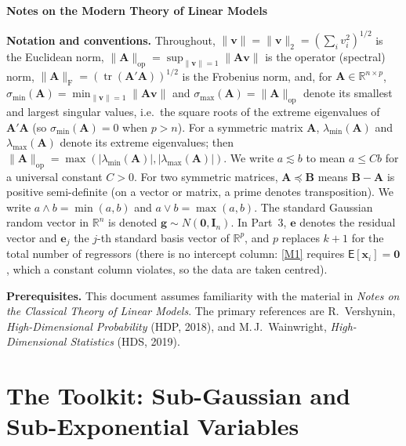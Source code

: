 \documentclass[14pt]{extarticle}
\theoremstyle{plain}
\theoremstyle{definition}
\theoremstyle{remark}
\newcommand\expc{\mathsf{E}}
\DeclareMathOperator\tr{tr}
\newcommand{\bx}{\mathbf{x}}
\newcommand{\bI}{\mathbf{I}}
\newcommand{\bzero}{\mathbf{0}}
\newcommand{\bA}{\mathbf{A}}
\newcommand{\bv}{\mathbf{v}}
\newcommand{\Real}{\mathbb{R}}
\newcommand{\opnorm}[1]{\|#1\|_{\mathrm{op}}}
\newcommand{\fnorm}[1]{\|#1\|_{\mathrm{F}}}
\begin{document}
\begingroup
\centering
{\LARGE\bfseries Notes on the Modern Theory of Linear Models\par}
\vspace{4pt}
\endgroup


\noindent\textbf{Notation and conventions.}\; Throughout, $\|\bv\| = \|\bv\|_2 = (\sum_i v_i^2)^{1/2}$ is the Euclidean norm, $\opnorm{\bA} = \sup_{\|\bv\|=1}\|\bA\bv\|$ is the operator (spectral) norm, $\fnorm{\bA} = (\tr(\bA'\bA))^{1/2}$ is the Frobenius norm, and, for $\bA \in \Real^{n \times p}$, $\sigma_{\min}(\bA) = \min_{\|\bv\|=1}\|\bA\bv\|$ and $\sigma_{\max}(\bA) = \opnorm{\bA}$ denote its smallest and largest singular values, i.e.\ the square roots of the extreme eigenvalues of $\bA'\bA$ (so $\sigma_{\min}(\bA) = 0$ when $p > n$). For a symmetric matrix $\bA$, $\lambda_{\min}(\bA)$ and $\lambda_{\max}(\bA)$ denote its extreme eigenvalues; then $\opnorm{\bA} = \max(|\lambda_{\min}(\bA)|, |\lambda_{\max}(\bA)|)$. We write $a \lesssim b$ to mean $a \leqslant Cb$ for a universal constant $C > 0$. For two symmetric matrices, $\bA \preceq \mathbf{B}$ means $\mathbf{B} - \bA$ is positive semi-definite (on a vector or matrix, a prime denotes transposition). We write $a \wedge b = \min(a,b)$ and $a \vee b = \max(a,b)$. The standard Gaussian random vector in $\Real^n$ is denoted $\mathbf{g} \sim N(\bzero, \bI_n)$. In Part~3, $\mathbf{e}$ denotes the residual vector and $\mathbf{e}_j$ the $j$-th standard basis vector of $\Real^p$, and $p$ replaces $k+1$ for the total number of regressors (there is no intercept column: \ref{M1} requires $\expc[\bx_i] = \bzero$, which a constant column violates, so the data are taken centred).

\bigskip\noindent\textbf{Prerequisites.}\; This document assumes familiarity with the material in \emph{Notes on the Classical Theory of Linear Models}. The primary references are R.\ Vershynin, \emph{High-Dimensional Probability} (HDP, 2018), and M.\,J.\ Wainwright, \emph{High-Dimensional Statistics} (HDS, 2019).

\part{The Toolkit: Sub-Gaussian and Sub-Exponential Variables}\label{part:toolkit}
\end{document}
